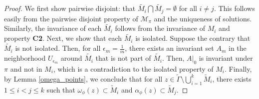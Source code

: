 \documentclass{article}
\theoremstyle{definition}
\newcommand{\eleanor}[1]{\textcolor{teal}{[EC: #1]}}
\begin{document}
\begin{proof}
  We first show pairwise disjoint: that $\tilde {M_i} \bigcap \tilde{M_j} = \emptyset$ for all $i \neq j$. This follows easily from the pairwise disjoint property of $\mathcal{M}_\pi$ and the uniqueness of solutions. Similarly, the invariance of each $\tilde{M_i}$ follows from the invariance of $M_i$ and property \textbf{C2}.  Next, we show that each $\tilde{M_i}$ is isolated. Suppose the contrary that $\tilde{M_i}$ is not isolated.  Then, for all $\epsilon_m=\frac{1}{m}$, there exists an invariant set $A_m$ in the neighborhood $U_{\epsilon_m}$ around $\tilde{M_i}$ that is not part of $\tilde{M_i}$.  Then, $A|_0$ is invariant under $\pi$ and not in $M_i$, which is a contradiction to the isolated property of $M_i$. 
Finally, by Lemma \ref{omega_points}, we conclude that for all $z \in \tilde{\Gamma} \setminus \bigcup^k_{i=1} \tilde{M}_i$, there exists $1 \leq i < j \leq k$ such that $\omega_\phi(z) \subset \tilde{M}_i$ and $\alpha_\phi(z) \subset \tilde{M}_j$. 

    
     
    
    





    
\end{proof}
\end{document}

